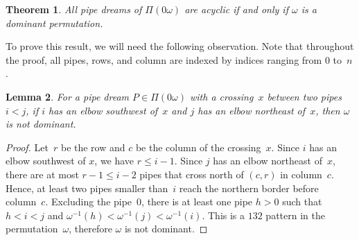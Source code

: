 \documentclass[reqno]{amsart}
\newtheorem{theorem}{Theorem}[section]
\newtheorem{lemma}[theorem]{Lemma}
\theoremstyle{definition}
\newcommand{\pipeDreams}{\Pi} %
\begin{document}
\begin{theorem}
\label{prob:nuAcyclicProperty}
All pipe dreams of $\pipeDreams(0\omega)$ are acyclic if and only if $\omega$ is a dominant permutation.
\end{theorem}

To prove this result, we will need the following observation.
Note that throughout the proof, all pipes, rows, and column are indexed by indices ranging from $0$ to~$n$.

\begin{lemma}
\label{lem:notDominant}
For a pipe dream $P \in \pipeDreams(0\omega)$ with a crossing~$x$ between two pipes~$i < j$, if $i$ has an elbow southwest of~$x$ and $j$ has an elbow northeast of~$x$, then $\omega$ is not dominant.
\end{lemma}

\begin{proof}
Let~$r$ be the row and $c$ be the column of the crossing~$x$. %
Since $i$ has an elbow southwest of $x$, we have $r \le i-1$.
Since $j$ has an elbow northeast of~$x$, there are at most $r-1 \le i-2$ pipes that cross north of $(c,r)$ in column~$c$.
Hence, at least two pipes smaller than~$i$ reach the northern border before column~$c$.
Excluding the pipe~$0$, there is at least one pipe $h > 0$ such that $h < i < j$ and $\omega^{-1}(h) < \omega^{-1}(j) < \omega^{-1}(i)$.
This is a $132$ pattern in the permutation~$\omega$, therefore $\omega$ is not dominant.
\end{proof}
\end{document}
